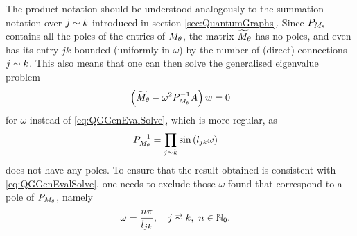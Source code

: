 The product notation should be understood analogously to the summation notation over $j\sim k$ introduced in section \ref{sec:QuantumGraphs}.
Since $P_{M_\theta}$ contains all the poles of the entries of $M_\theta$, the matrix $\widetilde{M}_\theta$ has no poles, and even has its entry $jk$ bounded (uniformly in $\omega$) by the number of (direct) connections $j\sim k$.
This also means that one can then solve the generalised eigenvalue problem
\begin{align} \label{eq:QGGenEvalSolveNoPoles}
	\left(  \widetilde{M}_\theta - \omega^2 P_{M_\theta}^{-1} A \right)w = 0
\end{align}
for $\omega$ instead of \eqref{eq:QGGenEvalSolve}, which is more regular, as
\begin{align*}
	P_{M_\theta}^{-1} &= \prod_{j\sim k}\sin\left( l_{jk}\omega \right)
\end{align*}
does not have any poles.
To ensure that the result obtained is consistent with \eqref{eq:QGGenEvalSolve}, one needs to exclude those $\omega$ found that correspond to a pole of $P_{M_\theta}$, namely
\begin{align*}
	\omega &= \frac{n\pi}{l_{jk}}, \quad j\conLeft k, \ n\in\naturals_{0}.
\end{align*}

